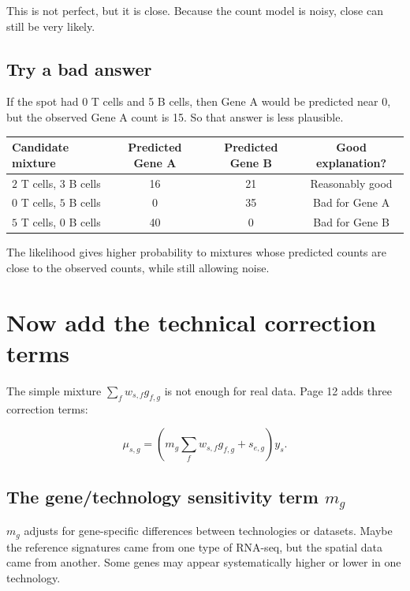 \documentclass[11pt]{article}
\begin{document}
This is not perfect, but it is close. Because the count model is noisy, close can still be very likely.

\subsection{Try a bad answer}

If the spot had 0 T cells and 5 B cells, then Gene A would be predicted near 0, but the observed Gene A count is 15. So that answer is less plausible.

\begin{center}
\begin{tabular}{lccc}
\toprule
Candidate mixture & Predicted Gene A & Predicted Gene B & Good explanation? \\
\midrule
$2$ T cells, $3$ B cells & 16 & 21 & Reasonably good \\
$0$ T cells, $5$ B cells & 0 & 35 & Bad for Gene A \\
$5$ T cells, $0$ B cells & 40 & 0 & Bad for Gene B \\
\bottomrule
\end{tabular}
\end{center}

\begin{bigidea}
The likelihood gives higher probability to mixtures whose predicted counts are close to the observed counts, while still allowing noise.
\end{bigidea}

\section{Now add the technical correction terms}

The simple mixture $\sum_f w_{s,f}g_{f,g}$ is not enough for real data. Page 12 adds three correction terms:

\[
\mu_{s,g}=\left(m_g\sum_f w_{s,f}g_{f,g}+s_{e,g}\right)y_s.
\]

\subsection{The gene/technology sensitivity term $m_g$}

$m_g$ adjusts for gene-specific differences between technologies or datasets. Maybe the reference signatures came from one type of RNA-seq, but the spatial data came from another. Some genes may appear systematically higher or lower in one technology.
\end{document}

